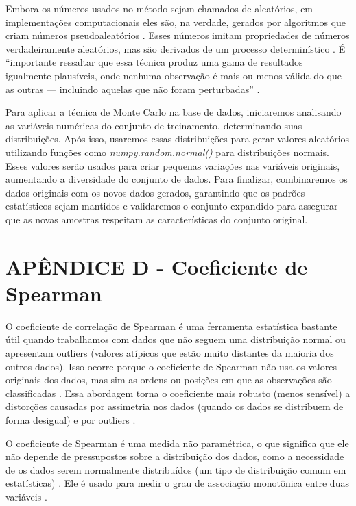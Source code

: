 \begin{apendicesenv}
Embora os números usados no método sejam chamados de aleatórios, em implementações computacionais eles são, na verdade, gerados por algoritmos que criam números pseudoaleatórios \cite{kalos2009}. Esses números imitam propriedades de números verdadeiramente aleatórios, mas são derivados de um processo determinístico \cite{kalos2009}. É “importante ressaltar que essa técnica produz uma gama de resultados igualmente plausíveis, onde nenhuma observação é mais ou menos válida do que as outras --- incluindo aquelas que não foram perturbadas” \cite{kiar2021}.

Para aplicar a técnica de Monte Carlo na base de dados, iniciaremos analisando as variáveis numéricas do conjunto de treinamento, determinando suas distribuições. Após isso, usaremos essas distribuições para gerar valores aleatórios utilizando funções como \textit{numpy.random.normal()} para distribuições normais. Esses valores serão usados para criar pequenas variações nas variáveis originais, aumentando a diversidade do conjunto de dados. Para finalizar, combinaremos os dados originais com os novos dados gerados, garantindo que os padrões estatísticos sejam mantidos e validaremos o conjunto expandido para assegurar que as novas amostras respeitam as características do conjunto original.

\chapter{APÊNDICE D - Coeficiente de Spearman}

O coeficiente de correlação de Spearman é uma ferramenta estatística bastante útil quando trabalhamos com dados que não seguem uma distribuição normal ou apresentam outliers (valores atípicos que estão muito distantes da maioria dos outros dados). Isso ocorre porque o coeficiente de Spearman não usa os valores originais dos dados, mas sim as ordens ou posições em que as observações são classificadas \cite{sousa2019}. Essa abordagem torna o coeficiente mais robusto (menos sensível) a distorções causadas por assimetria nos dados (quando os dados se distribuem de forma desigual) e por outliers \cite{sousa2019}.

O coeficiente de Spearman é uma medida não paramétrica, o que significa que ele não depende de pressupostos sobre a distribuição dos dados, como a necessidade de os dados serem normalmente distribuídos (um tipo de distribuição comum em estatísticas) \cite{restrepo2007}. Ele é usado para medir o grau de associação monotônica entre duas variáveis \cite{restrepo2007}.


\end{apendicesenv}
